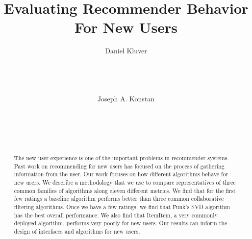 \documentclass[letterpaper]{sig-alternate}
\begin{document}

\title{Evaluating Recommender Behavior For New Users}


\author {
\alignauthor
Daniel Kluver\\
\\
\\
\\
\\
\alignauthor
Joseph A. Konstan\\
\\
\\
\\
\\
}

\maketitle
\begin{abstract}

  The new user experience is one of the important problems in recommender systems.
  Past work on recommending for new users has focused on the process of gathering information from the user.
  Our work focuses on how different algorithms behave for new users.
  We describe a methodology that we use to compare representatives of three common families of algorithms along eleven different metrics.
  We find that for the first few ratings a baseline algorithm performs better than three common collaborative filtering algorithms.
  Once we have a few ratings, we find that Funk's SVD algorithm has the best overall performance.
  We also find that ItemItem, a very commonly deployed algorithm, performs very poorly for new users.
  Our results can inform the design of interfaces and algorithms for new users.

\end{abstract}
\end{document}
